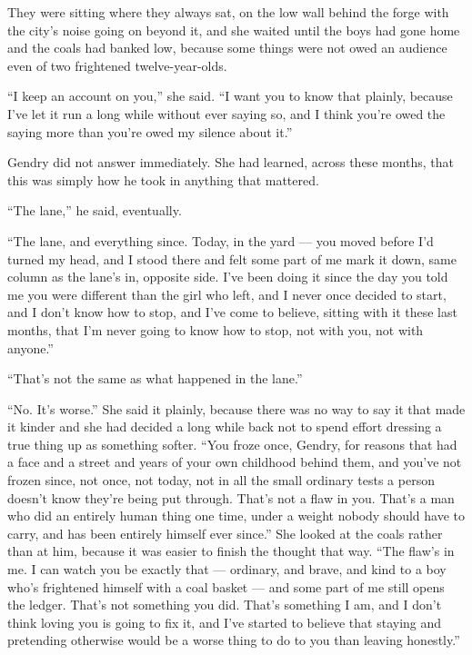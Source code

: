 They were sitting where they always sat, on the low wall behind the forge with the city’s noise going on beyond it, and she waited until the boys had gone home and the coals had banked low, because some things were not owed an audience even of two frightened twelve-year-olds.

“I keep an account on you,” she said. “I want you to know that plainly, because I’ve let it run a long while without ever saying so, and I think you’re owed the saying more than you’re owed my silence about it.”

Gendry did not answer immediately. She had learned, across these months, that this was simply how he took in anything that mattered.

“The lane,” he said, eventually.

“The lane, and everything since. Today, in the yard — you moved before I’d turned my head, and I stood there and felt some part of me mark it down, same column as the lane’s in, opposite side. I’ve been doing it since the day you told me you were different than the girl who left, and I never once decided to start, and I don’t know how to stop, and I’ve come to believe, sitting with it these last months, that I’m never going to know how to stop, not with you, not with anyone.”

“That’s not the same as what happened in the lane.”

“No. It’s worse.” She said it plainly, because there was no way to say it that made it kinder and she had decided a long while back not to spend effort dressing a true thing up as something softer. “You froze once, Gendry, for reasons that had a face and a street and years of your own childhood behind them, and you’ve not frozen since, not once, not today, not in all the small ordinary tests a person doesn’t know they’re being put through. That’s not a flaw in you. That’s a man who did an entirely human thing one time, under a weight nobody should have to carry, and has been entirely himself ever since.” She looked at the coals rather than at him, because it was easier to finish the thought that way. “The flaw’s in me. I can watch you be exactly that — ordinary, and brave, and kind to a boy who’s frightened himself with a coal basket — and some part of me still opens the ledger. That’s not something you did. That’s something I am, and I don’t think loving you is going to fix it, and I’ve started to believe that staying and pretending otherwise would be a worse thing to do to you than leaving honestly.”

\sceneBreak

